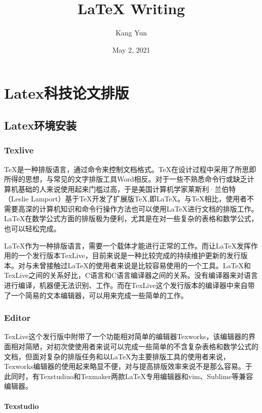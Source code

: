 \documentclass[12pt]{book}
\title{\LaTeX{} Writing}
\author{Kang Yun}
\date{May 2, 2021}
\begin{document}
\maketitle
\frontmatter

\tableofcontents

\part{Latex科技论文排版}

\chapter{Latex环境安装}

\section{Texlive}

\TeX{}是一种排版语言，通过命令来控制文档格式。\TeX{}在设计过程中采用了所思即所得的思想，与常见的文字排版工具Word相反。对于一些不熟悉命令行或缺乏计算机基础的人来说使用起来门槛过高，于是美国计算机学家莱斯利·兰伯特（Leslie Lamport）基于\TeX{}开发了扩展版\TeX{},即\LaTeX{}。与\TeX{}相比，使用者不需要高深的计算机知识和命令行操作方法也可以使用\LaTeX{}进行文档的排版工作。\LaTeX{}在数学公式方面的排版极为便利，尤其是在对一些复杂的表格和数学公式，也可以轻松完成。

\LaTeX{}作为一种排版语言，需要一个载体才能进行正常的工作。而让\LaTeX{}发挥作用的一个发行版本TexLive，目前来说是一种比较完成的持续维护更新的发行版本。对与未曾接触过\LaTeX{}的使用者来说是比较容易使用的一个工具。\LaTeX{}和TexLive之间的关系好比，C语言和C语言编译器之间的关系。没有编译器来对语言进行编译，机器便无法识别、工作。而在TexLive这个发行版本的编译器中来自带了一个简易的文本编辑器，可以用来完成一些简单的工作。

\section{Editor}

TexLive这个发行版中附带了一个功能相对简单的编辑器Texworks，该编辑器的界面相对简陋，对初次使使用者来说可以完成一些简单的不含复杂表格和数学公式的文档，但面对复杂的排版任务和以\LaTeX{}为主要排版工具的使用者来说，Texworks编辑器的使用起来略显不便，对与提高排版效率来说不是那么容易。于此同时，有Texstudiuo和Texmaker两款\LaTeX{}专用编辑器和vim、Sublime等兼容编辑器。

\subsection{Texstudio}
\end{document}
